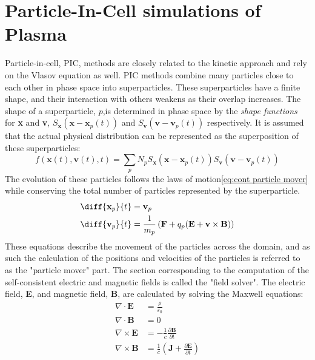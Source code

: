 \chapter{Particle-In-Cell simulations of Plasma}
\label{cha: pic}

\color{red}
Particle-in-cell, PIC, methods are closely related to the kinetic approach and rely on the Vlasov equation as well.
PIC methods combine many particles close to each other in phase space into superparticles. These superparticles have a finite shape, and their interaction with others weakens as their overlap increases. The shape of a superparticle, $p$,is determined in phase space by the \textit{shape functions} for \textbf{x} and \textbf{v}, $S_{\textbf{x}}(\textbf{x}-\textbf{x}_p(t))$ and $S_{\textbf{v}}(\textbf{v}-\textbf{v}_p(t))$ respectively. It is assumed that the actual physical distribution can be represented as the superposition of these superparticles:
\[f(\textbf{x}(t),\textbf{v}(t),t) = \sum_{p}N_pS_{\textbf{x}}(\textbf{x}-\textbf{x}_p(t))S_{\textbf{v}}(\textbf{v}-\textbf{v}_p(t))\]
The evolution of these particles follows the laws of motion\eqref{eq:cont particle mover} while conserving the total number of particles represented by the superparticle.
\begin{equation} \label{eq:cont particle mover}
\begin{split}
	\diff{{\textbf{x}_p}}{t} &= \textbf{v}_p \\
	\diff{{\textbf{v}_p}}{t} &= \frac{1}{m_p}\left(\textbf{F} + q_p(\textbf{E} + \textbf{v}\times \textbf{B})\right)
\end{split}
\end{equation}
These equations describe the movement of the particles across the domain, and as such the calculation of the positions and velocities of the particles is referred to as the "particle mover" part. The section corresponding to the computation of the self-consistent electric and magnetic fields is called the "field solver". The electric field, \textbf{E}, and magnetic field, \textbf{B}, are calculated by solving the Maxwell equations:
\begin{align}
	\nabla \cdot \mathbf{E} &= \frac{\rho}{\varepsilon_0} \\
	\nabla \cdot \mathbf{B} &= 0 \\
	\nabla \times \mathbf{E} &= -\frac{1}{c}\frac{\partial \mathbf{B}}{\partial t} \\
	\nabla \times \mathbf{B} &= \frac{1}{c}\left(\mathbf{J} + \frac{\partial \mathbf{E}}{\partial t}\right)
\end{align}
